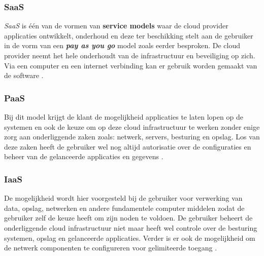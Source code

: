 \subsubsection{SaaS}
\textit{SaaS} is één van de vormen van \textbf{service models} waar de cloud provider applicaties ontwikkelt, onderhoud en deze ter beschikking stelt aan de gebruiker in de vorm van een \textbf{\textit{pay as you go}} model zoals eerder besproken. De cloud provider neemt het hele onderhoudt van de infrastructuur en beveiliging op zich. Via een computer en een internet verbinding kan er gebruik worden gemaakt van de software \autocite{OracleSaaS} \autocite{mell2011nist}.%


\subsubsection{PaaS}
Bij dit model krijgt de klant de mogelijkheid applicaties te laten lopen op de systemen en ook de keuze om op deze cloud infrastructuur te werken zonder enige zorg aan onderliggende zaken zoals: netwerk, servers, besturing en opslag. Los van deze zaken heeft de gebruiker wel nog altijd autorisatie over de configuraties en beheer van de gelanceerde applicaties en gegevens \autocite{mell2011nist}.

\subsubsection{IaaS}

De mogelijkheid wordt hier voorgesteld bij de gebruiker voor verwerking van data, opslag, netwerken en andere fundamentele computer middelen zodat de gebruiker zelf de keuze heeft om zijn noden te voldoen. De gebruiker beheert de onderliggende cloud infrastructuur niet maar heeft wel controle over de besturing systemen, opslag en gelanceerde applicaties. Verder is er ook de mogelijkheid om de netwerk componenten te configureren voor gelimiteerde toegang \autocite{mell2011nist}.
\newpage
